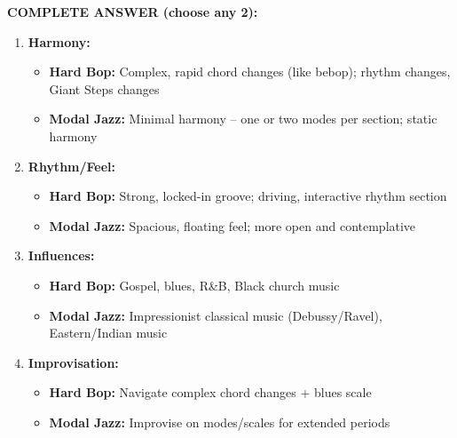 \documentclass[11pt]{article}
\begin{document}
\begin{mdframed}[backgroundcolor=answercolor!10, linewidth=2pt]
\textbf{\textcolor{answercolor}{COMPLETE ANSWER (choose any 2):}}

\begin{enumerate}[leftmargin=*, nosep]
    \item \textbf{Harmony:}
    \begin{itemize}[nosep]
        \item \textbf{Hard Bop:} Complex, rapid chord changes (like bebop); rhythm changes, Giant Steps changes
        \item \textbf{Modal Jazz:} Minimal harmony – one or two modes per section; static harmony
    \end{itemize}
    
    \item \textbf{Rhythm/Feel:}
    \begin{itemize}[nosep]
        \item \textbf{Hard Bop:} Strong, locked-in groove; driving, interactive rhythm section
        \item \textbf{Modal Jazz:} Spacious, floating feel; more open and contemplative
    \end{itemize}
    
    \item \textbf{Influences:}
    \begin{itemize}[nosep]
        \item \textbf{Hard Bop:} Gospel, blues, R\&B, Black church music
        \item \textbf{Modal Jazz:} Impressionist classical music (Debussy/Ravel), Eastern/Indian music
    \end{itemize}
    
    \item \textbf{Improvisation:}
    \begin{itemize}[nosep]
        \item \textbf{Hard Bop:} Navigate complex chord changes + blues scale
        \item \textbf{Modal Jazz:} Improvise on modes/scales for extended periods
    \end{itemize}
\end{enumerate}

\vspace{5pt}
\end{mdframed}
\end{document}
